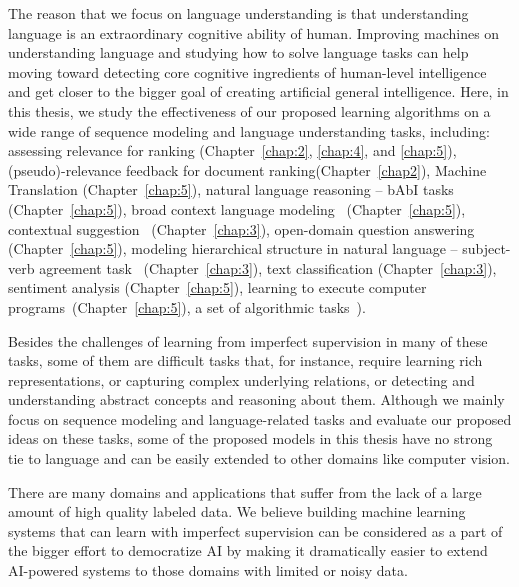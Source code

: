 The reason that we focus on language understanding is that understanding language is an extraordinary cognitive ability of human. Improving machines on understanding language and studying how to solve language tasks can help moving toward detecting core cognitive ingredients of human-level intelligence and get closer to the bigger goal of creating artificial general intelligence. 
Here, in this thesis, we study the effectiveness of our proposed learning algorithms on a wide range of sequence modeling and language understanding tasks, including:
% 
assessing relevance for ranking (Chapter~\ref{chap:2}, \ref{chap:4}, and \ref{chap:5}), 
%
(pseudo)-relevance feedback for document ranking(Chapter~\ref{chap2}), 
%
Machine Translation (Chapter~\ref{chap:5}), 
%
natural language reasoning -- bAbI tasks~\citep{weston2015towards} (Chapter~\ref{chap:5}), 
%
broad context language modeling~\citep{paperno2016lambada} (Chapter~\ref{chap:5}), 
%
contextual suggestion~\citep{hashemioverview} (Chapter~\ref{chap:3}), 
%
open-domain question answering (Chapter~\ref{chap:5}), 
%
modeling hierarchical structure in natural language -- subject-verb agreement task~\citep{linzen2016assessing} (Chapter~\ref{chap:3}), 
%
text classification (Chapter~\ref{chap:3}), 
%
sentiment analysis (Chapter~\ref{chap:5}), 
%
learning to execute computer programs~\citep{ZS14}(Chapter~\ref{chap:5}), 
%
a set of algorithmic tasks~\citep{neural_gpu}).

Besides the challenges of learning from imperfect supervision in many of these tasks, some of them are difficult tasks that, for instance, require learning rich representations, or capturing complex underlying relations, or detecting and understanding abstract concepts and reasoning about them.
%
Although we mainly focus on sequence modeling and language-related tasks and evaluate our proposed ideas on these tasks, some of the proposed models in this thesis have no strong tie to language and can be easily extended to other domains like computer vision.


\medskip
There are many domains and applications that suffer from the lack of a large amount of high quality labeled data. We believe building machine learning systems that can learn with imperfect supervision can be considered as a part of the bigger effort to democratize AI by making it dramatically easier to extend AI-powered systems to those domains with limited or noisy data.




